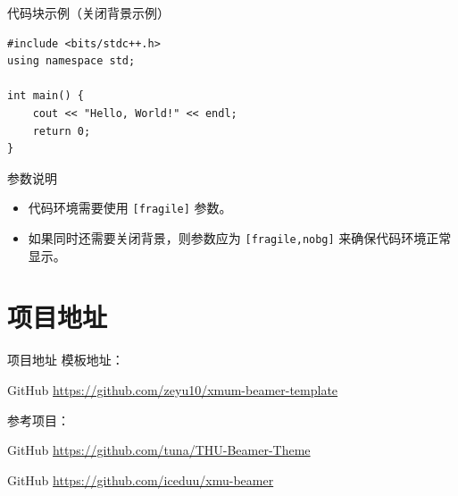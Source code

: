 \documentclass[aspectratio=169,11pt]{ctexbeamer}
\begin{document}
\begin{frame}{代码块示例（关闭背景示例）}
\begin{lstlisting}
#include <bits/stdc++.h>
using namespace std;

int main() {
    cout << "Hello, World!" << endl;
    return 0;
}
\end{lstlisting}
\vspace{5pt}
\begin{alertblock}{参数说明}
    \begin{itemize}
        \item 代码环境需要使用 \texttt{[fragile]} 参数。
        \item 如果同时还需要关闭背景，则参数应为 \texttt{[fragile,nobg]} 来确保代码环境正常显示。
    \end{itemize}
\end{alertblock}
\end{frame}

\section{项目地址}

\begin{frame}{项目地址}
    模板地址：
    \begin{block}{GitHub}
        \url{https://github.com/zeyu10/xmum-beamer-template}
    \end{block}

    参考项目：
    \begin{block}{GitHub}
        \url{https://github.com/tuna/THU-Beamer-Theme}
    \end{block}

    \begin{block}{GitHub}
        \url{https://github.com/iceduu/xmu-beamer}
    \end{block}
\end{frame}



%     
%     

\end{document}
